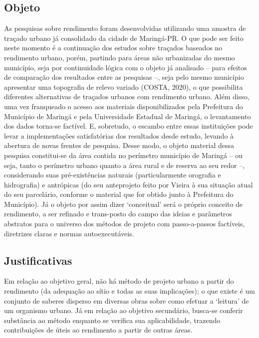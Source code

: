 \documentclass[twoside, 12pt]{book}
\begin{document}
    \subsection{Objeto}

        As pesquisas sobre rendimento foram desenvolvidas utilizando uma amostra de traçado urbano já consolidado da cidade de Maringá-PR. O que pode ser feito neste momento é a continuação dos estudos sobre traçados baseados no rendimento urbano, porém, partindo para áreas não urbanizadas do mesmo município, seja por continuidade lógica com o objeto já analisado – para efeitos de comparação dos resultados entre as pesquisas –, seja pelo mesmo município apresentar uma topografia de relevo variado (COSTA, 2020), o que possibilita diferentes alternativas de traçados urbanos com rendimento urbano. Além disso, uma vez franqueado o acesso aos materiais disponibilizados pela Prefeitura do Município de Maringá e pela Universidade Estadual de Maringá, o levantamento dos dados torna-se factível. E, sobretudo, o escambo entre essas instituições pode levar a implementações satisfatórias dos resultados desde estudo, levando à abertura de novas frentes de pesquisa. Desse modo, o objeto material dessa pesquisa constitui-se da área contida no perímetro município de Maringá – ou seja, tanto o perímetro urbano quanto a área rural e de reserva ao seu redor –, considerando suas pré-existências naturais (particularmente orografia e hidrografia) e antrópicas (do seu anteprojeto feito por Vieira à sua situação atual do seu parcelário, conforme o material que for obtido junto à Prefeitura do Município). Já o objeto por assim dizer ‘conceitual’ será o próprio conceito de rendimento, a ser refinado e trans-posto do campo das ideias e parâmetros abstratos para o universo dos métodos de projeto com passo-a-passos factíveis, diretrizes claras e normas autoexecutáveis.

    \subsection{Justificativas}


        Em relação ao objetivo geral, não há método de projeto urbano a partir do rendimento (da adequação ao sítio e todas as suas implicações); o que existe é um conjunto de saberes disperso em diversas obras sobre como efetuar a ‘leitura’ de um organismo urbano. Já em relação ao objetivo secundário, busca-se conferir substância ao método enquanto se verifica sua aplicabilidade, trazendo contribuições de úteis ao rendimento a partir de outras áreas.
\end{document}
